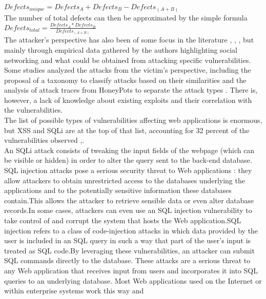  $ Defects_{ unique} = Defects _{A} +  Defects_{ B} - Defects_{ (A+B)} $\\
 
 The number of total defects can then be
 approximated by the simple formula\\

{ $ Defects_{total} = \frac{Defects_{ A} * Defects_{ B}}{Defects_{ (A+B)}} $} \\

The attacker's perspective has also been of some focus in
the literature  \cite{9}, \cite{17}, \cite{23}, but mainly through
empirical data gathered by the authors highlighting social
networking and what could be obtained from attacking
specific vulnerabilities. Some studies analyzed the attacks
from the victim's perspective, including the proposal of a
taxonomy to classify attacks based on their similarities \cite{2}
and the analysis of attack traces from HoneyPots to separate
the attack types \cite{24}. There is, however, a lack of knowledge
about existing exploits and their correlation with the
vulnerabilities.\\
\newline
The list of possible types of vulnerabilities affecting web
applications is enormous, but XSS and SQLi are at the top of
that list, accounting for 32 percent of the vulnerabilities
observed \cite{3},\cite{6}.\\
\newline An SQLi attack consists of tweaking the input fields of
the webpage (which can be visible or hidden) in order to
alter the query sent to the back-end database. 
SQL injection attacks pose a serious security threat to Web applications \cite{14}: they allow attackers to obtain unrestricted access to the
databases underlying the applications and to the potentially sensitive information these databases contain.This allows
the attacker to retrieve sensible data or even alter database
records.In some cases, attackers can even
use an SQL injection vulnerability to take control of and corrupt the
system that hosts the Web application.SQL injection refers to a class of code-injection attacks in which
data provided by the user is included in an SQL query in such a
way that part of the user’s input is treated as SQL code.By leveraging these vulnerabilities, an attacker can submit SQL commands
directly to the database. These attacks are a serious threat to any
Web application that receives input from users and incorporates it
into SQL queries to an underlying database. Most Web applications
used on the Internet or within enterprise systems work this way and

